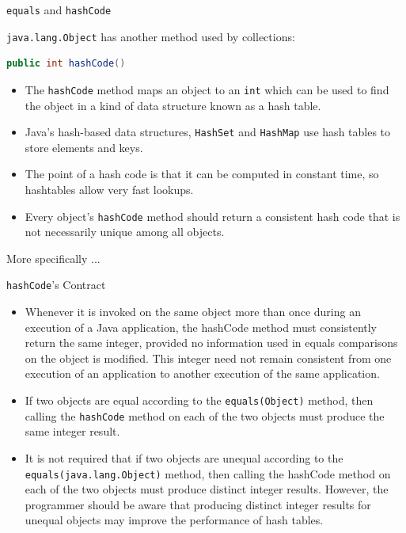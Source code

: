 \documentclass{beamer}
\begin{document}
\begin{frame}[fragile]{{\tt equals} and {\tt hashCode}}

{\tt java.lang.Object} has another method used by collections:
\begin{lstlisting}[language=Java]
public int hashCode()
\end{lstlisting}
\begin{itemize}
\item The {\tt hashCode} method maps an object to an {\tt int} which can be used to find the object in a kind of data structure known as a hash table.
\item Java's hash-based data structures, {\tt HashSet} and {\tt HashMap} use hash tables to store elements and keys.
\item The point of a hash code is that it can be computed in constant time, so hashtables allow very fast lookups.
\item Every object's {\tt hashCode} method should return a consistent hash code that  is not necessarily unique among all objects.
\end{itemize}

More specifically ...

\end{frame}

\begin{frame}[fragile]{{\tt hashCode}'s Contract}
\vspace{-.12in}
\begin{itemize}
\item Whenever it is invoked on the same object more than once during an execution of a Java application, the hashCode method must consistently return the same integer, provided no information used in equals comparisons on the object is modified. This integer need not remain consistent from one execution of an application to another execution of the same application.
\item If two objects are equal according to the {\tt equals(Object)} method, then calling the {\tt hashCode} method on each of the two objects must produce the same integer result.
\item It is not required that if two objects are unequal according to the {\tt equals(java.lang.Object)} method, then calling the hashCode method on each of the two objects must produce distinct integer results. However, the programmer should be aware that producing distinct integer results for unequal objects may improve the performance of hash tables.
\end{itemize}

\end{frame}
\end{document}
